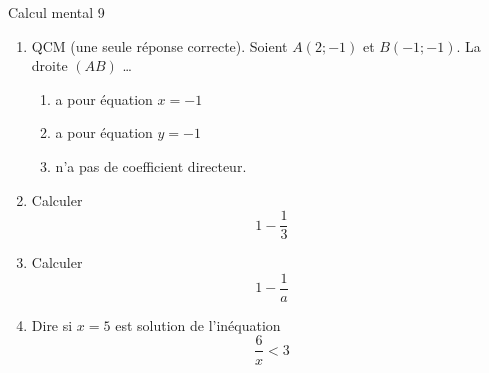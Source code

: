 \documentclass{beamer}
\begin{document}
\begin{frame}{Calcul mental 9}

    \pause
    \begin{enumerate}
        \item
            QCM (une seule réponse correcte). Soient \( A(2;-1)\) et \( B(-1;-1)\). La droite \( (AB)\) \ldots
            \begin{enumerate}
                \item
                    a pour équation \( x=-1\)
                \item
                    a pour équation \( y=-1\)
                \item
                    n'a pas de coefficient directeur.
            \end{enumerate}

            \pause
        \item
            Calculer 
            \begin{equation*}
                1- \frac{1}{ 3 }
            \end{equation*}
            \pause
        \item
            Calculer 
            \begin{equation*}
                1- \frac{1}{ a }
            \end{equation*}
            \pause
        \item
            Dire si \( x=5\) est solution de l'inéquation
            \begin{equation}
                \frac{ 6 }{ x }<3
            \end{equation}
            
    \end{enumerate}
\end{frame}
\end{document}
